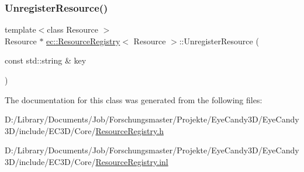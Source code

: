 \subsubsection{\texorpdfstring{Unregister\+Resource()}{UnregisterResource()}}
{\footnotesize\ttfamily template$<$class Resource $>$ \\
Resource $\ast$ \mbox{\hyperlink{classec_1_1_resource_registry}{ec\+::\+Resource\+Registry}}$<$ Resource $>$\+::Unregister\+Resource (\begin{DoxyParamCaption}\item[{const std\+::string \&}]{key }\end{DoxyParamCaption})}



The documentation for this class was generated from the following files\+:\begin{DoxyCompactItemize}
\item 
D\+:/\+Library/\+Documents/\+Job/\+Forschungsmaster/\+Projekte/\+Eye\+Candy3\+D/\+Eye\+Candy3\+D/include/\+E\+C3\+D/\+Core/\mbox{\hyperlink{_resource_registry_8h}{Resource\+Registry.\+h}}\item 
D\+:/\+Library/\+Documents/\+Job/\+Forschungsmaster/\+Projekte/\+Eye\+Candy3\+D/\+Eye\+Candy3\+D/include/\+E\+C3\+D/\+Core/\mbox{\hyperlink{_resource_registry_8inl}{Resource\+Registry.\+inl}}\end{DoxyCompactItemize}
